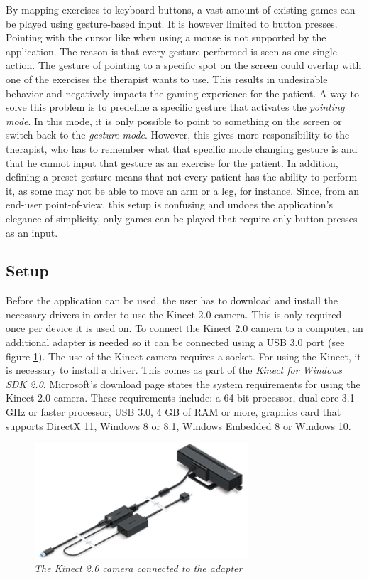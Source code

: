 By mapping exercises to keyboard buttons, a vast amount of existing games can be played using gesture-based input. It is however limited to button presses. Pointing with the cursor like when using a mouse is not supported by the application. The reason is that every gesture performed is seen as one single action. The gesture of pointing to a specific spot on the screen could overlap with one of the exercises the therapist wants to use. This results in undesirable behavior and negatively impacts the gaming experience for the patient. A way to solve this problem is to predefine a specific gesture that activates the \emph{pointing mode}. In this mode, it is only possible to point to something on the screen or switch back to the \emph{gesture mode}. However, this gives more responsibility to the therapist, who has to remember what that specific mode changing gesture is and that he cannot input that gesture as an exercise for the patient. In addition, defining a preset gesture means that not every patient has the ability to perform it, as some may not be able to move an arm or a leg, for instance. Since, from an end-user point-of-view, this setup is confusing and undoes the application's elegance of simplicity, only games can be played that require only button presses as an input.\\




\subsection{Setup}

Before the application can be used, the user has to download and install the necessary drivers in order to use the Kinect 2.0 camera. This is only required once per device it is used on. To connect the Kinect 2.0 camera to a computer, an additional adapter is needed so it can be connected using a USB 3.0 port (see figure \ref{fig: kinect}). The use of the Kinect camera requires a socket. For using the Kinect, it is necessary to install a driver. This comes as part of the \emph{Kinect for Windows SDK 2.0}. Microsoft's download page \cite{KinectSDK} states the system requirements for using the Kinect 2.0 camera. These requirements include: a 64-bit processor, dual-core 3.1 GHz or faster processor, USB 3.0, 4 GB of RAM or more, graphics card that supports DirectX 11, Windows 8 or 8.1, Windows Embedded 8 or Windows 10.\\

\begin{figure}[H]
\begin{center}
\includegraphics[width=8cm]{KinectAdapter.png}
\caption{\emph{The Kinect 2.0 camera connected to the adapter}}
\label{fig: kinect}
\end{center}
\end{figure}

